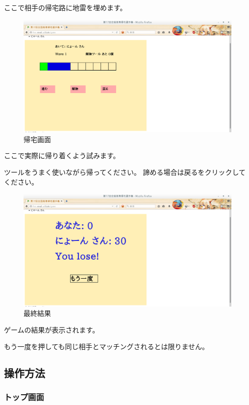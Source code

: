 ここで相手の帰宅路に地雷を埋めます。

\begin{figure}[htbp]
\centering
\includegraphics{./do.png}
\caption{帰宅画面}
\end{figure}

ここで実際に帰り着くよう試みます。

ツールをうまく使いながら帰ってください。
諦める場合は戻るをクリックしてください。

\begin{figure}[htbp]
\centering
\includegraphics{./result.png}
\caption{最終結果}
\end{figure}

ゲームの結果が表示されます。

もう一度を押しても同じ相手とマッチングされるとは限りません。

\subsection{操作方法}\label{ux64cdux4f5cux65b9ux6cd5}

\subsubsection{トップ画面}\label{ux30c8ux30c3ux30d7ux753bux9762}

